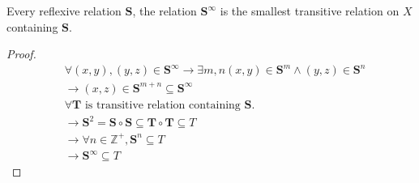 \begin{Lem}
    Every reflexive relation $\mathbf{S}$, the relation $\mathbf{S}^{\infty}$ is the smallest transitive relation on $X$ containing $\mathbf{S}$.

    \begin{proof}
        \begin{align*}
            &\forall (x,y),(y,z)\in \mathbf{S}^{\infty}\rightarrow  \exists m,n (x,y)\in \mathbf{S}^m \wedge (y,z)\in \mathbf{S}^n  \\
            &\rightarrow (x,z) \in \mathbf{S}^{m+n} \subseteq \mathbf{S}^{\infty}   \\
            &\forall \mathbf{T} \text{ is transitive relation containing }\mathbf{S}.\\
            &\rightarrow \mathbf{S}^2=\mathbf{S}\circ \mathbf{S}\subseteq \mathbf{T}\circ \mathbf{T}\subseteq T \\
            &\rightarrow \forall n \in \mathbb{Z}^+, \mathbf{S}^n \subseteq T   \\
            &\rightarrow \mathbf{S}^{\infty} \subseteq T
        \end{align*}
    \end{proof}
\end{Lem}

